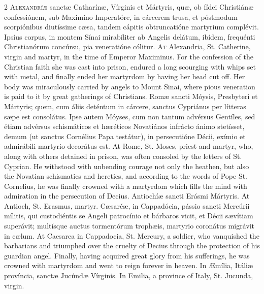 \begin{paracol}{2}
\lettrine[lines=2]{A}{lexandríæ} sanctæ 
 Catharínæ, Vírginis et Mártyris, quæ, ob fídei Christiánæ confessiónem, sub 
 Maximíno Imperatóre, in cárcerem trusa, et póstmodum scorpiónibus diutíssime 
 cæsa, tandem cápitis obtruncatióne martyrium complévit. Ipsíus corpus, 
 in montem Sínai mirabíliter ab Angelis delátum, ibídem, frequénti 
 Christianórum concúrsu, pia veneratióne cólitur.
\switchcolumn
{}
\lettrine[lines=2]{A}{t} Alexandria, St. Catherine, virgin 
 and martyr, in the time of Emperor Maximinus. For the confession of 
 the Christian faith she was cast into prison, endured a long scourging with 
 whips set with metal, and finally ended her martyrdom by having her head cut 
 off. Her body was miraculously carried by angels to Mount Sinai, where 
 pious veneration is paid to it by great gatherings of Christians.
\switchcolumn*
{}
Romæ sancti Móysis, Presbyteri et Mártyris; quem, cum áliis deténtum in
	cárcere, sanctus Cypriánus per lítteras sæpe est consolátus. Ipse autem
	Móyses, cum non tantum advérsus Gentíles, sed étiam advérsus schismáticos
	et hæréticos Novatiános infrácto ánimo stetísset, demum (ut sanctus
	Cornélius Papa testátur), in persecutióne Décii, exímio et admirábili
	martyrio decorátus est.
\switchcolumn
{}
At Rome, St. Moses, priest and 
 martyr, who, along with others detained in prison, was often consoled by the 
 letters of St. Cyprian. He withstood with unbending courage not only 
 the heathen, but also the Novatian schismatics and heretics, and according 
 to the words of Pope St. Cornelius, he was finally crowned with a martyrdom 
 which fills the mind with admiration in the persecution of Decius.
\switchcolumn*
{}
Antiochíæ sancti Erásmi 
 Mártyris.
\switchcolumn
{}
At Antioch, St. Erasmus, martyr.
\switchcolumn*
{}
Cæsaréæ, in Cappadócia, pássio sancti Mercúrii mílitis, qui custodiéntis se Angeli patrocínio et 
 bárbaros vicit, et Décii sævítiam superávit; multísque auctus tormentórum 
 trophæis, martyrio coronátus migrávit in cælum.
\switchcolumn
{}
At Caesarea in Cappadocia, St. 
 Mercury, a soldier, who vanquished the barbarians and triumphed over the 
 cruelty of Decius through the protection of his guardian angel. 
 Finally, having acquired great glory from his sufferings, he was crowned 
 with martyrdom and went to reign forever in heaven.
\switchcolumn*
{}
In Æmília, Itáliæ 
 província, sanctæ Jucúndæ Vírginis.
\switchcolumn
{}
In Emilia, a province of Italy, St. 
 Jucunda, virgin.
\switchcolumn*
{}
\end{paracol}


